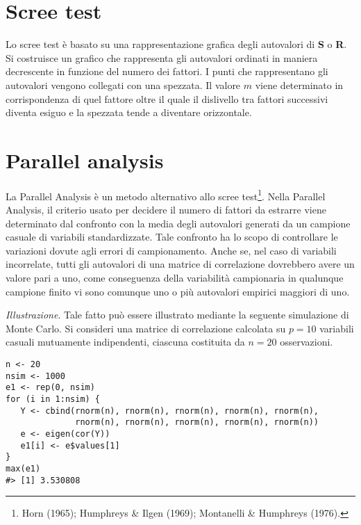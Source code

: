 \section{Scree test}

Lo scree test è basato su una rappresentazione grafica degli
autovalori di \textbf{S} o \textbf{R}.
 Si costruisce un grafico che
rappresenta gli autovalori ordinati in maniera decrescente in funzione
del numero dei fattori.
 I punti che rappresentano gli autovalori
vengono collegati con una spezzata.
 Il valore $m$ viene determinato in
corrispondenza di quel fattore oltre il quale il dislivello tra
fattori successivi diventa esiguo e la spezzata tende a diventare
orizzontale.


\section{Parallel analysis}

La Parallel Analysis è un metodo alternativo allo scree test\footnote{ 
Horn (1965); Humphreys \& Ilgen (1969);
Montanelli \& Humphreys (1976).}.  Nella Parallel Analysis, il criterio usato per decidere il numero di 
fattori da estrarre viene determinato dal confronto con  la
media degli autovalori generati da un campione casuale di
variabili standardizzate. 
 Tale confronto ha lo scopo di controllare le variazioni
dovute agli errori di campionamento.
  Anche se, nel caso di variabili  incorrelate,  tutti gli autovalori di
una matrice di correlazione dovrebbero avere un valore pari a uno, come
conseguenza della variabilità campionaria in qualunque campione finito
vi sono comunque uno o più autovalori empirici maggiori di uno. 

\bigskip

\textit{Illustrazione}. Tale fatto può essere illustrato mediante la seguente
    simulazione di Monte Carlo. 
Si
consideri una matrice di correlazione calcolata su $p=10$ variabili casuali mutuamente  indipendenti, ciascuna costituita da $n=20$ osservazioni. 

\begin{lstlisting}
n <- 20 
nsim <- 1000 
e1 <- rep(0, nsim) 
for (i in 1:nsim) { 
   Y <- cbind(rnorm(n), rnorm(n), rnorm(n), rnorm(n), rnorm(n), 
              rnorm(n), rnorm(n), rnorm(n), rnorm(n), rnorm(n)) 
   e <- eigen(cor(Y)) 
   e1[i] <- e$values[1] 
}
max(e1)
#> [1] 3.530808
\end{lstlisting}


